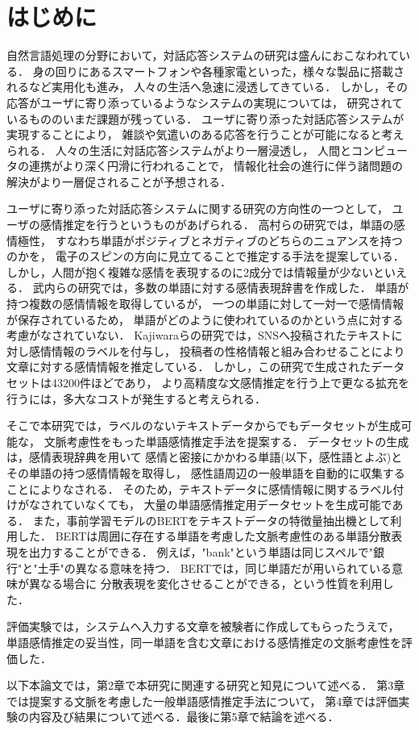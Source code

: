 \chapter{はじめに}
自然言語処理の分野において，対話応答システムの研究は盛んにおこなわれている．
身の回りにあるスマートフォンや各種家電といった，様々な製品に搭載されるなど実用化も進み，
人々の生活へ急速に浸透してきている．
しかし，その応答がユーザに寄り添っているようなシステムの実現については，
研究されているもののいまだ課題が残っている．
ユーザに寄り添った対話応答システムが実現することにより，
雑談や気遣いのある応答を行うことが可能になると考えられる．
人々の生活に対話応答システムがより一層浸透し，
人間とコンピュータの連携がより深く円滑に行われることで，
情報化社会の進行に伴う諸問題の解決がより一層促されることが予想される．

ユーザに寄り添った対話応答システムに関する研究の方向性の一つとして，
ユーザの感情推定を行うというものがあげられる．
高村らの研究\cite{spin_kyokusei}では，単語の感情極性，
すなわち単語がポジティブとネガティブのどちらのニュアンスを持つのかを，
電子のスピンの方向に見立てることで推定する手法を提案している．
しかし，人間が抱く複雑な感情を表現するのに2成分では情報量が少ないといえる．
武内らの研究\cite{takeuchi}では，多数の単語に対する感情表現辞書を作成した．
単語が持つ複数の感情情報を取得しているが，
一つの単語に対して一対一で感情情報が保存されているため，
単語がどのように使われているのかという点に対する考慮がなされていない．
Kajiwaraらの研究\cite{kajiwara-wrime}では，SNSへ投稿されたテキストに対し感情情報のラベルを付与し，
投稿者の性格情報と組み合わせることにより文章に対する感情情報を推定している．
しかし，この研究で生成されたデータセットは43200件ほどであり，
より高精度な文感情推定を行う上で更なる拡充を行うには，多大なコストが発生すると考えられる．

そこで本研究では，ラベルのないテキストデータからでもデータセットが生成可能な，
文脈考慮性をもった単語感情推定手法を提案する．
データセットの生成は，感情表現辞典\cite{kanjou_hyogen_jiten}を用いて
感情と密接にかかわる単語(以下，感性語とよぶ)とその単語の持つ感情情報を取得し，
感性語周辺の一般単語を自動的に収集することによりなされる．
そのため，テキストデータに感情情報に関するラベル付けがなされていなくても，
大量の単語感情推定用データセットを生成可能である．
また，事前学習モデルのBERT\cite{BERT}をテキストデータの特徴量抽出機として利用した．
BERTは周囲に存在する単語を考慮した文脈考慮性のある単語分散表現を出力することができる．
例えば，"bank"という単語は同じスペルで"銀行"と"土手"の異なる意味を持つ．
BERTでは，同じ単語だが用いられている意味が異なる場合に
分散表現を変化させることができる，という性質を利用した．


評価実験では，システムへ入力する文章を被験者に作成してもらったうえで，
単語感情推定の妥当性，同一単語を含む文章における感情推定の文脈考慮性を評価した．

以下本論文では，第2章で本研究に関連する研究と知見について述べる．
第3章では提案する文脈を考慮した一般単語感情推定手法について，
第4章では評価実験の内容及び結果について述べる．最後に第5章で結論を述べる．
